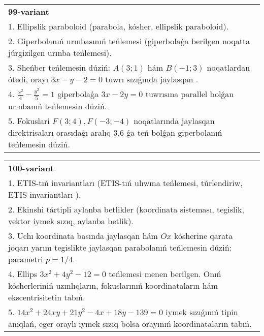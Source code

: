 \documentclass{article}
\begin{document}
\begin{tabular}{m{17cm}}
\textbf{99-variant}\\
1. Ellipslik paraboloid (parabola, kósher, ellipslik paraboloid).\\

2. Giperbolanıń urınbasınıń teńlemesi (giperbolaǵa berilgen noqatta júrgizilgen urınba teńlemesi).\\

3. Sheńber teńlemesin dúziń: $A (3;1) $ hám $B (-1;3) $ noqatlardan ótedi, orayı $3 x-y-2=0$ tuwrı sızıǵında jaylasqan .\\

4. $\frac{x^{2}}{4} - \frac{y^{2}}{5} = 1$ giperbolaǵa $3x - 2y = 0$ tuwrısına parallel bolǵan urınbanıń teńlemesin dúziń.  \\

5. Fokuslari $F(3;4), F(-3;-4)$ noqatlarında jaylasqan direktrisaları orasıdaǵı aralıq 3,6 ǵa teń bolǵan giperbolanıń teńlemesin dúziń.  
\end{tabular}
\vspace{1cm}


\begin{tabular}{m{17cm}}
\textbf{100-variant}\\
1. ETIS-tıń invariantları (ETIS-tıń ulıwma teńlemesi, túrlendiriw, ETIS invariantları ).\\

2. Ekinshi tártipli aylanba betlikler (koordinata sisteması, tegislik, vektor iymek sızıq, aylanba betlik).\\

3. Uchı koordinata basında jaylasqan hám $Ox$ kósherine qarata joqarı yarım tegislikte jaylasqan parabolanıń teńlemesin dúziń: parametri $p=1/4$.\\

4. Ellips $3x^{2} + 4y^{2} - 12 = 0$ teńlemesi menen berilgen. Onıń kósherleriniń uzınlıqların, fokuslarınıń koordinataların hám ekscentrisitetin tabıń.  \\

5. $14x^{2} + 24xy + 21y^{2} - 4x + 18y - 139 = 0$ iymek sızıǵınıń tipin anıqlań, eger oraylı iymek sızıq bolsa orayınıń koordinataların tabıń.  
\end{tabular}
\vspace{1cm}
\end{document}

